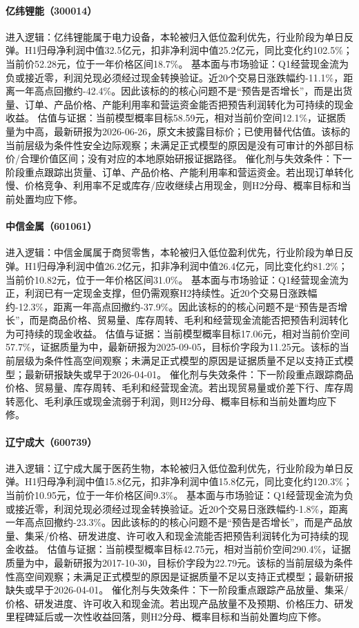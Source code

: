 \paragraph{亿纬锂能（300014）}
进入逻辑：亿纬锂能属于电力设备，本轮被归入低位盈利优先，行业阶段为单日反弹。H1归母净利润中值32.5亿元，扣非净利润中值25.2亿元，同比变化约102.5\%；当前价52.28元，位于一年价格区间18.7\%。
基本面与市场验证：Q1经营现金流为负或接近零，利润兑现必须经过现金转换验证。近20个交易日涨跌幅约-11.1\%，距离一年高点回撤约-42.4\%。因此该标的的核心问题不是“预告是否增长”，而是出货量、订单、产品价格、产能利用率和营运资金能否把预告利润转化为可持续的现金收益。
估值与证据：当前模型概率目标58.59元，相对当前价空间12.1\%，证据质量为中高，最新研报为2026-06-26，原文未披露目标价；已使用替代估值。该标的当前层级为条件性安全边际观察；未满足正式模型的原因是没有可审计的外部目标价/合理价值区间；没有对应的本地原始研报证据路径。
催化剂与失效条件：下一阶段重点跟踪出货量、订单、产品价格、产能利用率和营运资金。若出现订单转化慢、价格竞争、利用率不足或库存/应收继续占用现金，则H2分母、概率目标和当前处置均应下修。

\paragraph{中信金属（601061）}
进入逻辑：中信金属属于商贸零售，本轮被归入低位盈利优先，行业阶段为单日反弹。H1归母净利润中值26.2亿元，扣非净利润中值26.4亿元，同比变化约81.2\%；当前价10.82元，位于一年价格区间31.0\%。
基本面与市场验证：Q1经营现金流为正，利润已有一定现金支撑，但仍需观察H2持续性。近20个交易日涨跌幅约-12.3\%，距离一年高点回撤约-37.9\%。因此该标的的核心问题不是“预告是否增长”，而是商品价格、贸易量、库存周转、毛利和经营现金流能否把预告利润转化为可持续的现金收益。
估值与证据：当前模型概率目标17.06元，相对当前价空间57.7\%，证据质量为中，最新研报为2025-09-05，目标价字段为11.25元。该标的当前层级为条件性高空间观察；未满足正式模型的原因是证据质量不足以支持正式模型；最新研报缺失或早于2026-04-01。
催化剂与失效条件：下一阶段重点跟踪商品价格、贸易量、库存周转、毛利和经营现金流。若出现贸易量或价差下行、库存周转恶化、毛利承压或现金流弱于利润，则H2分母、概率目标和当前处置均应下修。

\paragraph{辽宁成大（600739）}
进入逻辑：辽宁成大属于医药生物，本轮被归入低位盈利优先，行业阶段为单日反弹。H1归母净利润中值15.8亿元，扣非净利润中值15.8亿元，同比变化约120.3\%；当前价10.95元，位于一年价格区间9.3\%。
基本面与市场验证：Q1经营现金流为负或接近零，利润兑现必须经过现金转换验证。近20个交易日涨跌幅约-1.8\%，距离一年高点回撤约-23.3\%。因此该标的的核心问题不是“预告是否增长”，而是产品放量、集采/价格、研发进度、许可收入和现金流能否把预告利润转化为可持续的现金收益。
估值与证据：当前模型概率目标42.75元，相对当前价空间290.4\%，证据质量为中，最新研报为2017-10-30，目标价字段为22.79元。该标的当前层级为条件性高空间观察；未满足正式模型的原因是证据质量不足以支持正式模型；最新研报缺失或早于2026-04-01。
催化剂与失效条件：下一阶段重点跟踪产品放量、集采/价格、研发进度、许可收入和现金流。若出现产品放量不及预期、价格压力、研发里程碑延后或一次性收益回落，则H2分母、概率目标和当前处置均应下修。

